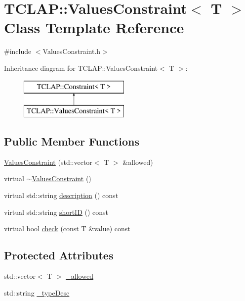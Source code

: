 \hypertarget{class_t_c_l_a_p_1_1_values_constraint}{}\section{T\+C\+L\+A\+P\+:\+:Values\+Constraint$<$ T $>$ Class Template Reference}
\label{class_t_c_l_a_p_1_1_values_constraint}


{\ttfamily \#include $<$Values\+Constraint.\+h$>$}

Inheritance diagram for T\+C\+L\+A\+P\+:\+:Values\+Constraint$<$ T $>$\+:\begin{figure}[H]
\begin{center}
\leavevmode
\includegraphics[height=2.000000cm]{class_t_c_l_a_p_1_1_values_constraint}
\end{center}
\end{figure}
\subsection*{Public Member Functions}
\begin{DoxyCompactItemize}
\item 
\hyperlink{class_t_c_l_a_p_1_1_values_constraint_a8ab127461012bb1dcfac159e17105db9}{Values\+Constraint} (std\+::vector$<$ T $>$ \&allowed)
\item 
virtual \hyperlink{class_t_c_l_a_p_1_1_values_constraint_a9b0c218300a9e0937386f2e566ba21bd}{$\sim$\+Values\+Constraint} ()
\item 
virtual std\+::string \hyperlink{class_t_c_l_a_p_1_1_values_constraint_a07b08c05a7bfcbe5815895353ffef1d5}{description} () const 
\item 
virtual std\+::string \hyperlink{class_t_c_l_a_p_1_1_values_constraint_a1bbe12afcb1f185ee7ac808d69e2d345}{short\+I\+D} () const 
\item 
virtual bool \hyperlink{class_t_c_l_a_p_1_1_values_constraint_ae132b185413cf5dea5cc040f60e7ede6}{check} (const T \&value) const 
\end{DoxyCompactItemize}
\subsection*{Protected Attributes}
\begin{DoxyCompactItemize}
\item 
std\+::vector$<$ T $>$ \hyperlink{class_t_c_l_a_p_1_1_values_constraint_ac43fa83688358c0ad06157053cce347a}{\+\_\+allowed}
\item 
std\+::string \hyperlink{class_t_c_l_a_p_1_1_values_constraint_a6ebc63fa5eea116a50aa5f76aee56fd6}{\+\_\+type\+Desc}
\end{DoxyCompactItemize}


